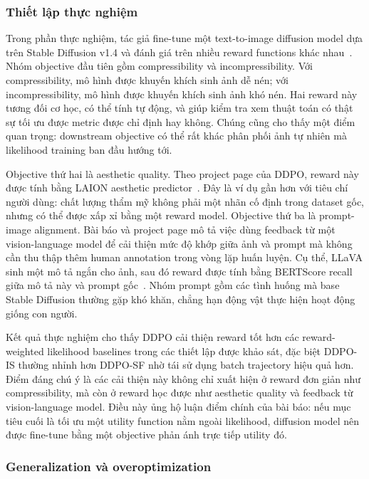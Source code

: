 \subsubsection*{Thiết lập thực nghiệm}

Trong phần thực nghiệm, tác giả fine-tune một text-to-image diffusion model dựa trên Stable Diffusion v1.4 và đánh giá trên nhiều reward functions khác nhau~\citep{black2024ddpo,black2024ddpoproject}.
Nhóm objective đầu tiên gồm compressibility và incompressibility.
Với compressibility, mô hình được khuyến khích sinh ảnh dễ nén; với incompressibility, mô hình được khuyến khích sinh ảnh khó nén.
Hai reward này tương đối cơ học, có thể tính tự động, và giúp kiểm tra xem thuật toán có thật sự tối ưu được metric được chỉ định hay không.
Chúng cũng cho thấy một điểm quan trọng: downstream objective có thể rất khác phân phối ảnh tự nhiên mà likelihood training ban đầu hướng tới.

Objective thứ hai là aesthetic quality.
Theo project page của DDPO, reward này được tính bằng LAION aesthetic predictor~\citep{black2024ddpoproject,schuhmann2022laionaesthetics}.
Đây là ví dụ gần hơn với tiêu chí người dùng: chất lượng thẩm mỹ không phải một nhãn cố định trong dataset gốc, nhưng có thể được xấp xỉ bằng một reward model.
Objective thứ ba là prompt-image alignment.
Bài báo và project page mô tả việc dùng feedback từ một vision-language model để cải thiện mức độ khớp giữa ảnh và prompt mà không cần thu thập thêm human annotation trong vòng lặp huấn luyện.
Cụ thể, LLaVA sinh một mô tả ngắn cho ảnh, sau đó reward được tính bằng BERTScore recall giữa mô tả này và prompt gốc~\citep{black2024ddpo,black2024ddpoproject,liu2023llava,zhang2020bertscore}.
Nhóm prompt gồm các tình huống mà base Stable Diffusion thường gặp khó khăn, chẳng hạn động vật thực hiện hoạt động giống con người.

Kết quả thực nghiệm cho thấy DDPO cải thiện reward tốt hơn các reward-weighted likelihood baselines trong các thiết lập được khảo sát, đặc biệt DDPO-IS thường nhỉnh hơn DDPO-SF nhờ tái sử dụng batch trajectory hiệu quả hơn.
Điểm đáng chú ý là các cải thiện này không chỉ xuất hiện ở reward đơn giản như compressibility, mà còn ở reward học được như aesthetic quality và feedback từ vision-language model.
Điều này ủng hộ luận điểm chính của bài báo: nếu mục tiêu cuối là tối ưu một utility function nằm ngoài likelihood, diffusion model nên được fine-tune bằng một objective phản ánh trực tiếp utility đó.

\subsubsection*{Generalization và overoptimization}

